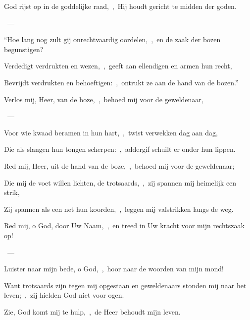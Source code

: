 \documentclass[12pt,twoside,a5paper]{article}
\begin{document}

\begin{halfparskip}
   God rijst op in de goddelijke raad,~\sep\ Hij houdt gericht te midden der goden.

  ~--- 

  ``Hoe lang nog zult gij onrechtvaardig oordelen,~\sep\ en de zaak der bozen begunstigen?

  Verdedigt verdrukten en wezen,~\sep\ geeft aan ellendigen en armen hun recht,

  Bevrijdt verdrukten en behoeftigen:~\sep\ ontrukt ze aan de hand van de bozen.''
\end{halfparskip}


\begin{halfparskip}
   Verlos mij, Heer, van de boze,~\sep\ behoed mij voor de geweldenaar,

  ~--- 

  Voor wie kwaad beramen in hun hart,~\sep\ twist verwekken dag aan dag,

  Die als slangen hun tongen scherpen:~\sep\ addergif schuilt er onder hun lippen.

  Red mij, Heer, uit de hand van de boze,~\sep\ behoed mij voor de geweldenaar;

  Die mij de voet willen lichten, de trotsaards,~\sep\ zij spannen mij heimelijk een strik,

  Zij spannen als een net hun koorden,~\sep\ leggen mij valstrikken langs de weg.
\end{halfparskip}


\begin{halfparskip}
   Red mij, o God, door Uw Naam,~\sep\ en treed in Uw kracht voor mijn rechtszaak op!

  ~--- 

  Luister naar mijn bede, o God,~\sep\ hoor naar de woorden van mijn mond!

  Want trotsaards zijn tegen mij opgestaan en geweldenaars stonden mij naar het leven;~\sep\ zij hielden God niet voor ogen.

  Zie, God komt mij te hulp,~\sep\ de Heer behoudt mijn leven.
\end{halfparskip}
\end{document}
